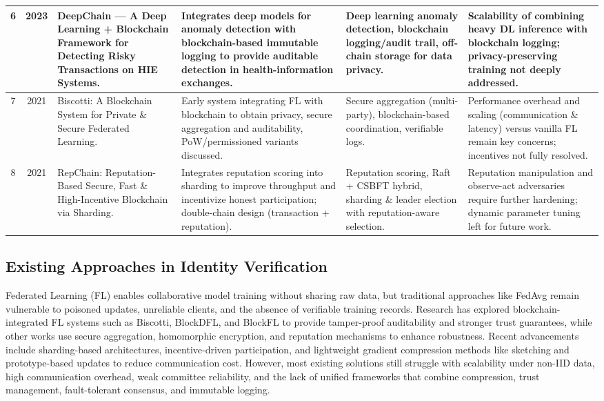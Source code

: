 \documentclass[12pt,a4paper]{article}
\begin{document}
\begin{table}[h]
\begin{tabularx}{\textwidth}{|c|c|X|X|X|X|}
6 & 2023 & DeepChain --- A Deep Learning + Blockchain Framework for Detecting Risky Transactions on HIE Systems. & Integrates deep models for anomaly detection with blockchain-based immutable logging to provide auditable detection in health-information exchanges. & Deep learning anomaly detection, blockchain logging/audit trail, off-chain storage for data privacy. & Scalability of combining heavy DL inference with blockchain logging; privacy-preserving training not deeply addressed. \\ \hline
7 & 2021 & Biscotti: A Blockchain System for Private \& Secure Federated Learning. & Early system integrating FL with blockchain to obtain privacy, secure aggregation and auditability, PoW/permissioned variants discussed. & Secure aggregation (multi-party), blockchain-based coordination, verifiable logs. & Performance overhead and scaling (communication \& latency) versus vanilla FL remain key concerns; incentives not fully resolved. \\ \hline
8 & 2021 & RepChain: Reputation-Based Secure, Fast \& High-Incentive Blockchain via Sharding. & Integrates reputation scoring into sharding to improve throughput and incentivize honest participation; double-chain design (transaction + reputation). & Reputation scoring, Raft + CSBFT hybrid, sharding \& leader election with reputation-aware selection. & Reputation manipulation and observe-act adversaries require further hardening; dynamic parameter tuning left for future work. \\ \hline
\end{tabularx}
\end{table}

\subsection{Existing Approaches in Identity Verification}
Federated Learning (FL) enables collaborative model training without sharing raw data, but traditional approaches like FedAvg remain vulnerable to poisoned updates, unreliable clients, and the absence of verifiable training records. Research has explored blockchain-integrated FL systems such as Biscotti, BlockDFL, and BlockFL to provide tamper-proof auditability and stronger trust guarantees, while other works use secure aggregation, homomorphic encryption, and reputation mechanisms to enhance robustness. Recent advancements include sharding-based architectures, incentive-driven participation, and lightweight gradient compression methods like sketching and prototype-based updates to reduce communication cost. However, most existing solutions still struggle with scalability under non-IID data, high communication overhead, weak committee reliability, and the lack of unified frameworks that combine compression, trust management, fault-tolerant consensus, and immutable logging.
\end{document}
